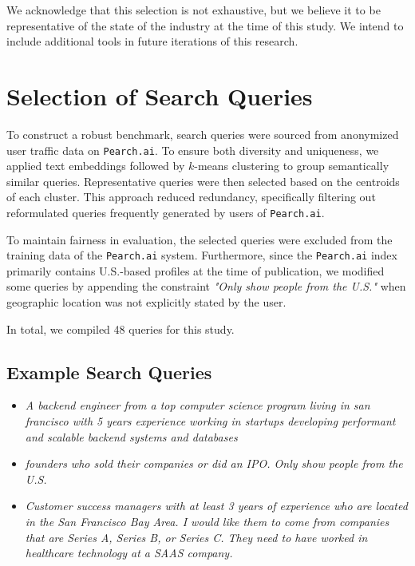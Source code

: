 \documentclass{article}
\begin{document}
We acknowledge that this selection is not exhaustive, but we believe it to be representative of the state of the industry at the time of this study. We intend to include additional tools in future iterations of this research.


\section{Selection of Search Queries}

To construct a robust benchmark, search queries were sourced from anonymized user traffic data on \texttt{Pearch.ai}. To ensure both diversity and uniqueness, we applied text embeddings \cite{reimers2019sentence} followed by $k$-means clustering to group semantically similar queries. Representative queries were then selected based on the centroids of each cluster. This approach reduced redundancy, specifically filtering out reformulated queries frequently generated by users of \texttt{Pearch.ai}.

To maintain fairness in evaluation, the selected queries were excluded from the training data of the \texttt{Pearch.ai} system. Furthermore, since the \texttt{Pearch.ai} index primarily contains U.S.-based profiles at the time of publication, we modified some queries by appending the constraint \emph{"Only show people from the U.S."} when geographic location was not explicitly stated by the user.

In total, we compiled 48 queries for this study.  

\subsection*{Example Search Queries}

\begin{itemize}
    \item \textit{A backend engineer from a top computer science program living in san francisco with 5 years experience working in startups developing performant and scalable backend systems and databases}
    \item \textit{founders who sold their companies or did an IPO. Only show people from the U.S.}
    \item \textit{Customer success managers with at least 3 years of experience who are located in the San Francisco Bay Area. I would like them to come from companies that are Series A, Series B, or Series C. They need to have worked in healthcare technology at a SAAS company.}
\end{itemize}
 
\end{document}
